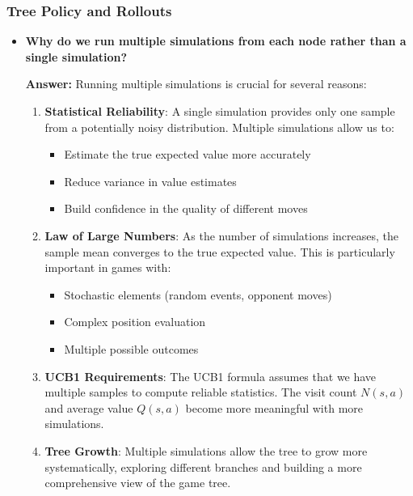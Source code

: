 \subsubsection{Tree Policy and Rollouts}
\begin{itemize} 
   \item \textbf{Why do we run multiple simulations from each node rather than a single simulation?}
   
   \textbf{Answer:} Running multiple simulations is crucial for several reasons:
   
   \begin{enumerate}
       \item \textbf{Statistical Reliability}: A single simulation provides only one sample from a potentially noisy distribution. Multiple simulations allow us to:
       \begin{itemize}
           \item Estimate the true expected value more accurately
           \item Reduce variance in value estimates
           \item Build confidence in the quality of different moves
       \end{itemize}
       
       \item \textbf{Law of Large Numbers}: As the number of simulations increases, the sample mean converges to the true expected value. This is particularly important in games with:
       \begin{itemize}
           \item Stochastic elements (random events, opponent moves)
           \item Complex position evaluation
           \item Multiple possible outcomes
       \end{itemize}
       
       \item \textbf{UCB1 Requirements}: The UCB1 formula assumes that we have multiple samples to compute reliable statistics. The visit count $N(s,a)$ and average value $Q(s,a)$ become more meaningful with more simulations.
       
       \item \textbf{Tree Growth}: Multiple simulations allow the tree to grow more systematically, exploring different branches and building a more comprehensive view of the game tree.
   \end{enumerate}
   

\end{itemize}
